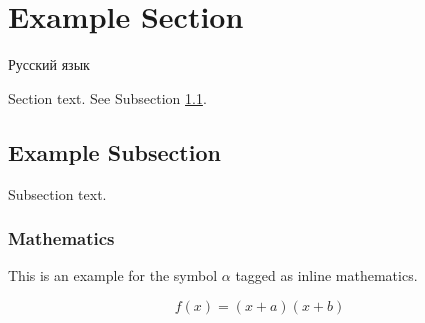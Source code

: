 \documentclass[preprint,12pt]{elsarticle}
\begin{document}


\section{Example Section}
\label{sec1}
Русский язык

Section text. See Subsection \ref{subsec1}.

\subsection{Example Subsection}
\label{subsec1}

Subsection text.


\subsubsection{Mathematics}
This is an example for the symbol $\alpha$ tagged as inline mathematics.

\begin{equation}
f(x) = (x+a)(x+b)
\end{equation}
\end{document}

